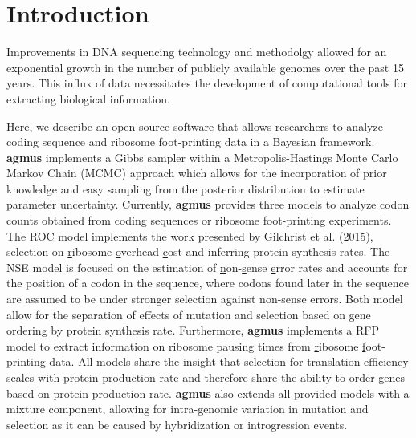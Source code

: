 \documentclass{bioinfo}
\newcommand{\package}{\textbf{agmus }} %
\begin{document}
\section*{Introduction}
Improvements in DNA sequencing technology and methodolgy allowed for an exponential growth in the number of publicly available genomes over the past 15 years.
This influx of data necessitates the development of computational tools for extracting biological information.

Here, we describe an open-source software that allows researchers to analyze coding sequence and ribosome foot-printing data in a Bayesian framework. 
\package implements a Gibbs sampler within a Metropolis-Hastings Monte Carlo Markov Chain (MCMC) approach which allows for the incorporation of prior knowledge and easy sampling from the posterior distribution to estimate parameter uncertainty.
Currently, \package provides three models to analyze codon counts obtained from coding sequences or ribosome foot-printing experiments. 
The ROC model implements the work presented by Gilchrist et al. (2015), selection on \underline{r}ibosome \underline{o}verhead \underline{c}ost and inferring protein synthesis rates.
The NSE model is focused on the estimation of \underline{n}on-\underline{s}ense \underline{e}rror rates and accounts for the position of a codon in the sequence, where codons found later in the sequence are assumed to be under stronger selection against non-sense errors.
Both model allow for the separation of effects of mutation and selection based on gene ordering by protein synthesis rate.
Furthermore, \package implements a RFP model to extract information on ribosome pausing times from \underline{r}ibosome \underline{f}oot-\underline{p}rinting data. 
All models share the insight that selection for translation efficiency scales with protein production rate and therefore share the ability to order genes based on protein production rate. 
\package also extends all provided models with a mixture component, allowing for intra-genomic variation in mutation and selection as it can be caused by hybridization or introgression events.
\end{document}
